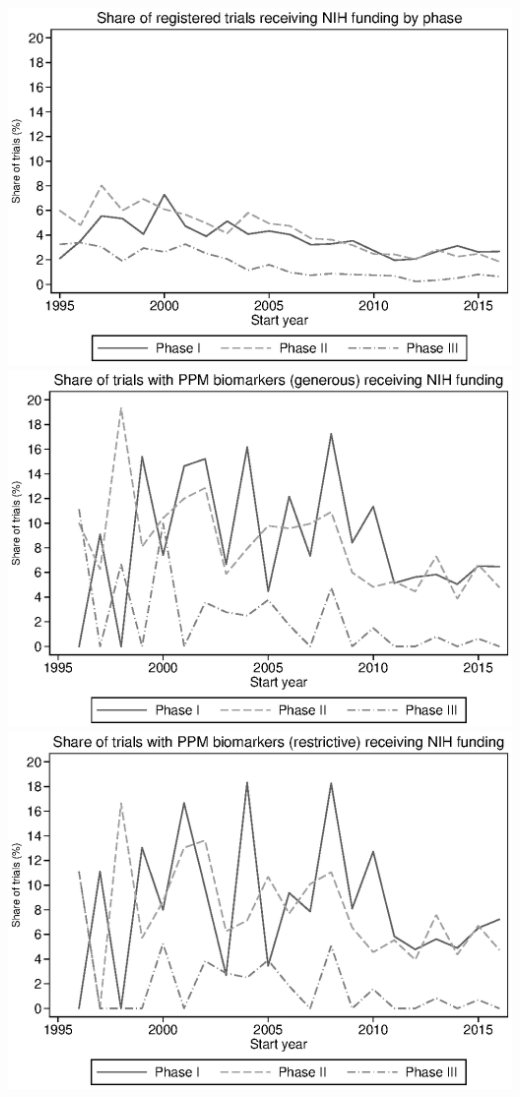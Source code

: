 \includegraphics{../figures/09a-nih_share_by_phase.eps}
\includegraphics{../figures/09b-nih_share_by_phase_g_ppm.eps}
\includegraphics{../figures/09c-nih_share_by_phase_r_ppm.eps}
